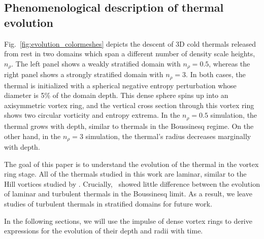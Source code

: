 \documentclass[twocolumn, amsmath, amsfonts, amssymb, trackchanges]{aastex62}
\newcommand{\LJ}{\citetalias{lecoanet&jeevanjee2018}}
\begin{document}
\subsection{Phenomenological description of thermal evolution}
Fig.~\ref{fig:evolution_colormeshes} depicts the descent of 3D cold thermals released from rest in two domains which span a different number of density scale heights, $n_\rho$.
The left panel shows a weakly stratified domain with $n_\rho=0.5$, whereas the right panel shows a strongly stratified domain with $n_\rho=3$.
In both cases, the thermal is initialized with a spherical negative entropy perturbation whose diameter is 5\% of the domain depth.
This dense sphere spins up into an axisymmetric vortex ring, and the vertical cross section through this vortex ring shows two circular vorticity and entropy extrema.
In the $n_\rho = 0.5$ simulation, the thermal grows with depth, similar to thermals in the Boussinesq regime.
On the other hand, in the $n_\rho = 3$ simulation, the thermal's radius decreases marginally with depth.

The goal of this paper is to understand the evolution of the thermal in the vortex ring stage.
All of the thermals studied in this work are laminar, similar to the Hill vortices studied by \citet{brandenburg2016}.
Crucially, \LJ\, showed little difference between the evolution of laminar and turbulent thermals in the Boussinesq limit.
As a result, we leave studies of turbulent thermals in stratified domains for future work.

In the following sections, we will use the impulse of dense vortex rings to derive expressions for the evolution of their depth and radii with time.
\end{document}
